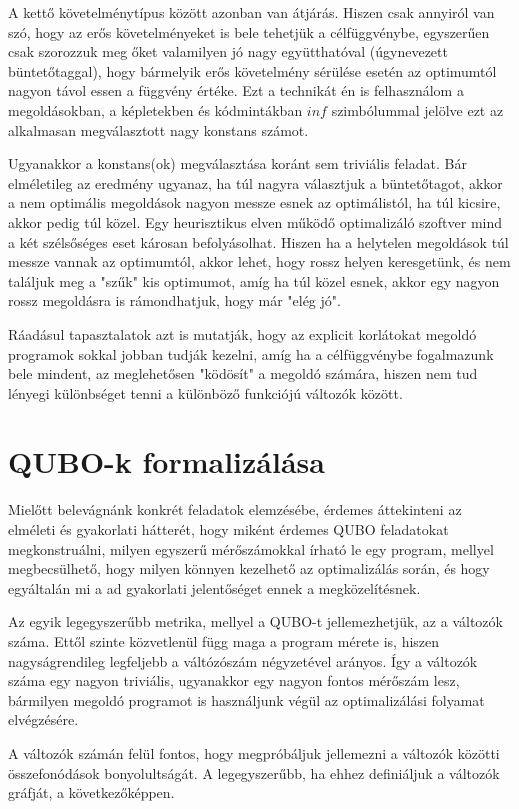 A kettő követelménytípus között azonban van átjárás. Hiszen csak annyiról van szó, hogy az erős követelményeket is bele tehetjük a célfüggvénybe, egyszerűen csak szorozzuk meg őket valamilyen jó nagy együtthatóval (úgynevezett büntetőtaggal), hogy bármelyik erős követelmény sérülése esetén az optimumtól nagyon távol essen a függvény értéke.
Ezt a technikát én is felhasználom a megoldásokban, a képletekben és kódmintákban $inf$ szimbólummal jelölve ezt az alkalmasan megválasztott nagy konstans számot.

Ugyanakkor a konstans(ok) megválasztása koránt sem triviális feladat. Bár elméletileg az eredmény ugyanaz, ha túl nagyra választjuk a büntetőtagot, akkor a nem optimális megoldások nagyon messze esnek az optimálistól, ha túl kicsire, akkor pedig túl közel. Egy heurisztikus elven működő optimalizáló szoftver mind a két szélsőséges eset károsan befolyásolhat. Hiszen ha a helytelen megoldások túl messze vannak az optimumtól, akkor lehet, hogy rossz helyen keresgetünk, és nem találjuk meg a "szűk" kis optimumot, amíg ha túl közel esnek, akkor egy nagyon rossz megoldásra is rámondhatjuk, hogy már "elég jó".

Ráadásul tapasztalatok azt is mutatják, hogy az explicit korlátokat megoldó programok sokkal jobban tudják kezelni, amíg ha a célfüggvénybe fogalmazunk bele mindent, az meglehetősen "ködösít" a megoldó számára, hiszen nem tud lényegi különbséget tenni a különböző funkciójú változók között.

\section{QUBO-k formalizálása}

Mielőtt belevágnánk konkrét feladatok elemzésébe, érdemes áttekinteni az elméleti és gyakorlati hátterét, hogy miként érdemes QUBO feladatokat megkonstruálni, milyen egyszerű mérőszámokkal írható le egy program, mellyel megbecsülhető, hogy milyen könnyen kezelhető az optimalizálás során, és hogy egyáltalán mi a ad gyakorlati jelentőséget ennek a megközelítésnek.

Az egyik legegyszerűbb metrika, mellyel a QUBO-t jellemezhetjük, az a változók száma. Ettől szinte közvetlenül függ maga a program mérete is, hiszen nagyságrendileg legfeljebb a váltózószám négyzetével arányos. Így a változók száma egy nagyon triviális, ugyanakkor egy nagyon fontos mérőszám lesz, bármilyen megoldó programot is használjunk végül az optimalizálási folyamat elvégzésére.

A változók számán felül fontos, hogy megpróbáljuk jellemezni a változók közötti összefonódások bonyolultságát. A legegyszerűbb, ha ehhez definiáljuk a változók gráfját, a következőképpen.

